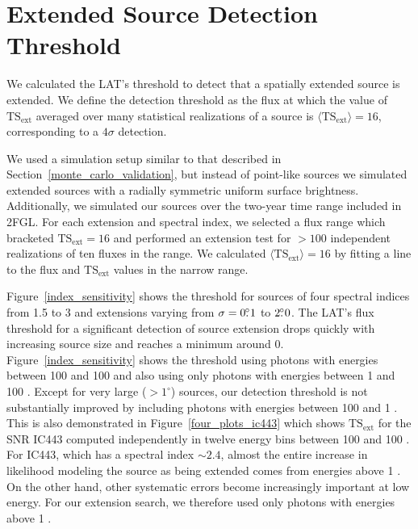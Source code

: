 \documentclass[12pt,preprint]{aastex}
\newcommand{\mev}{\text{MeV}\xspace}
\newcommand{\gev}{\text{GeV}\xspace}
\newcommand{\tsext}{{\ensuremath{\text{TS}_{\text{ext}}}}\xspace}
\newcommand{\degree}{^\circ\xspace}
\begin{document}
\section{Extended Source Detection Threshold}
\label{extension_sensitivity}

We calculated the LAT's threshold to detect that a spatially extended
source is extended. We define the detection threshold as the flux at which the value
of $\tsext$ averaged over many statistical realizations of a source
is $\langle\tsext\rangle=16$, corresponding to a $4\sigma$ detection.

We used a simulation setup similar to that described in
Section~\ref{monte_carlo_validation}, but instead of point-like sources
we simulated extended
sources with a radially symmetric uniform surface
brightness. Additionally, we
simulated our sources over the two-year time range included
in 2FGL.
For each extension and
spectral index, we selected a flux range which bracketed $\tsext=16$
and performed an extension test for $>100$ independent realizations of
ten fluxes in the range.
We calculated $\langle\tsext\rangle=16$ by fitting a line to the flux
and $\tsext$ values in the narrow range.

Figure~\ref{index_sensitivity} shows the threshold for sources of four
spectral indices from 1.5 to 3 and extensions varying from $\sigma=0\mbox{$.\!\!^\circ$}1$
to $2\mbox{$.\!\!^\circ$}0$.  The LAT's flux threshold for a significant detection
of source extension drops quickly with
increasing source size and reaches a minimum around 0. 
Figure~\ref{index_sensitivity} shows
the threshold using photons with energies between 100 \mev and 100 \gev
and also using only photons with energies between 1 \gev and 100 \gev.
Except for very large ($>1\degree$) sources, our detection threshold is
not substantially improved by including photons with energies between 100 \mev and
1 \gev.  This is also demonstrated in Figure~\ref{four_plots_ic443}
which shows \tsext for the SNR IC443 computed independently in twelve
energy bins between 100 \mev and 100 \gev. For IC443, which has a
spectral index $\sim2.4$, almost the entire increase in likelihood
modeling the source as being extended comes
from energies above 1 \gev.  On the other hand, other systematic errors
become increasingly important at low energy. For our extension search,
we therefore used only photons with energies above 1 \gev.
\end{document}
